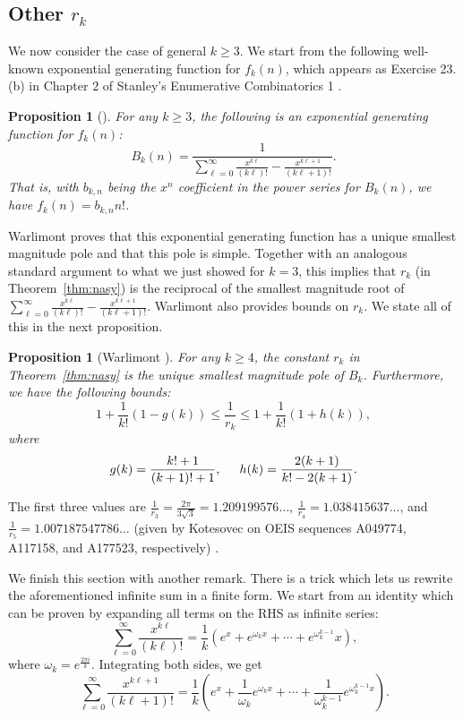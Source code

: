 \documentclass{amsart}
\newtheorem{proposition}[theorem]{Proposition}
\theoremstyle{definition}
\begin{document}
\subsection{Other $r_k$} We now consider the case of general $k\geq 3$. We start from the following well-known exponential generating function for $f_k(n)$, which appears as Exercise 23.(b) in Chapter $2$ of Stanley's Enumerative Combinatorics 1 \cite{10.5555/2124415}.

\begin{proposition}[\cite{genfunc}]
For any $k\geq 3$, the following is an exponential generating function for $f_k(n)$:
\[B_k(n)=\frac{1}{\sum_{\ell=0}^\infty \frac{x^{k\ell}}{(k\ell)!}-\frac{x^{k\ell+1}}{(k\ell+1)!}}.\]
That is, with $b_{k,n}$ being the $x^n$ coefficient in the power series for $B_k(n)$, we have $f_k(n)=b_{k,n}n!$.
\end{proposition}
Warlimont \cite{warlimont} proves that this exponential generating function has a unique smallest magnitude pole and that this pole is simple. Together with an analogous standard argument to what we just showed for $k=3$, this implies that $r_k$ (in Theorem~\ref{thm:nasy}) is the reciprocal of the smallest magnitude root of $\sum_{\ell=0}^\infty \frac{x^{k\ell}}{(k\ell)!}-\frac{x^{k\ell+1}}{(k\ell+1)!}$. Warlimont also provides bounds on $r_k$. We state all of this in the next proposition.

\begin{proposition}[Warlimont \cite{warlimont}]\label{prop:war}
For any $k\geq 4$, the constant $r_k$ in Theorem~\ref{thm:nasy} is the unique smallest magnitude pole of $B_k$. Furthermore, we have the following bounds:
\[1+\frac{1}{k!}\left(1-g(k)\right)\leq \frac{1}{r_k}\leq 1+\frac{1}{k!}\left(1+h(k)\right),\]
where
\[g(k)=\frac{k!+1}{(k+1)!+1},\hspace{5mm}h(k)=\frac{2(k+1)}{k!-2(k+1)}.\]
\end{proposition}

The first three values are $\frac{1}{r_3}=\frac{2\pi}{3\sqrt{3}}=1.209199576\ldots$, $\frac{1}{r_4}=1.038415637\ldots$, and $\frac{1}{r_5}=1.007187547786\ldots$ (given by Kotesovec on OEIS sequences A049774, A117158, and A177523, respectively) \cite{oeis}.

We finish this section with another remark. There is a trick which lets us rewrite the aforementioned infinite sum in a finite form. We start from an identity which can be proven by expanding all terms on the RHS as infinite series:
\[\sum_{\ell=0}^\infty \frac{x^{k\ell}}{(k\ell)!}=\frac{1}{k}\left(e^x+e^{\omega_k x}+\cdots+e^{\omega_k^{k-1}}x\right),\]
where $\omega_k=e^{\frac{2\pi i}{k}}$. Integrating both sides, we get
\[\sum_{\ell=0}^\infty \frac{x^{k\ell+1}}{(k\ell+1)!}=\frac{1}{k}\left(e^x+\frac{1}{\omega_k}e^{\omega_k x}+\cdots+\frac{1}{\omega_k^{k-1}} e^{\omega_k^{k-1}x}\right).\]
\end{document}
